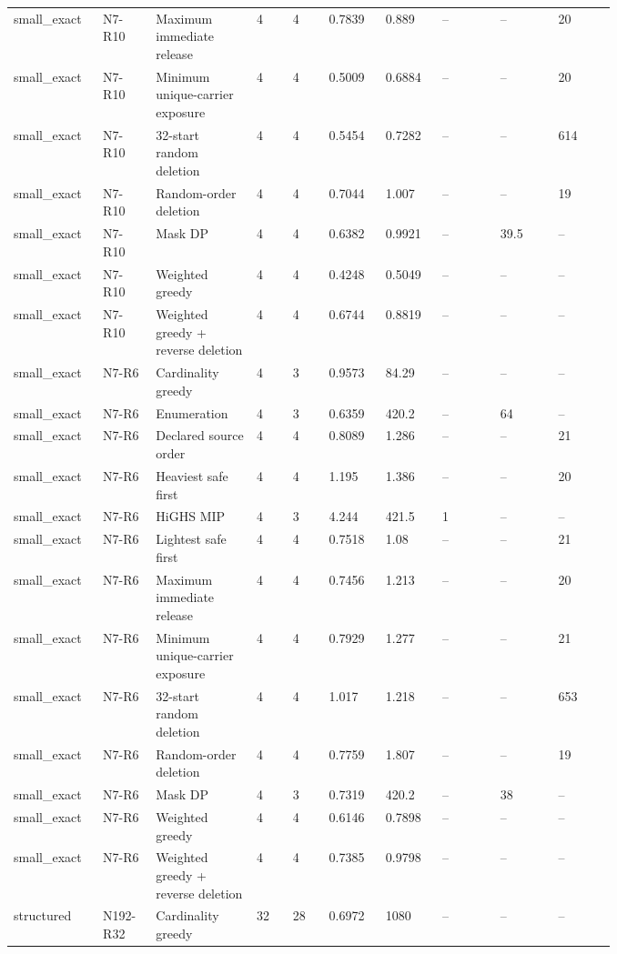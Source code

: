 {\begin{longtable}{p{0.07\linewidth}p{0.06\linewidth}p{0.13\linewidth}p{0.055\linewidth}p{0.055\linewidth}p{0.075\linewidth}p{0.075\linewidth}p{0.085\linewidth}p{0.085\linewidth}p{0.085\linewidth}}
small\_exact & N7-R10 & Maximum immediate release & 4 & 4 & 0.7839 & 0.889 & -- & -- & 20 \\
small\_exact & N7-R10 & Minimum unique-carrier exposure & 4 & 4 & 0.5009 & 0.6884 & -- & -- & 20 \\
small\_exact & N7-R10 & 32-start random deletion & 4 & 4 & 0.5454 & 0.7282 & -- & -- & 614 \\
small\_exact & N7-R10 & Random-order deletion & 4 & 4 & 0.7044 & 1.007 & -- & -- & 19 \\
small\_exact & N7-R10 & Mask DP & 4 & 4 & 0.6382 & 0.9921 & -- & 39.5 & -- \\
small\_exact & N7-R10 & Weighted greedy & 4 & 4 & 0.4248 & 0.5049 & -- & -- & -- \\
small\_exact & N7-R10 & Weighted greedy + reverse deletion & 4 & 4 & 0.6744 & 0.8819 & -- & -- & -- \\
small\_exact & N7-R6 & Cardinality greedy & 4 & 3 & 0.9573 & 84.29 & -- & -- & -- \\
small\_exact & N7-R6 & Enumeration & 4 & 3 & 0.6359 & 420.2 & -- & 64 & -- \\
small\_exact & N7-R6 & Declared source order & 4 & 4 & 0.8089 & 1.286 & -- & -- & 21 \\
small\_exact & N7-R6 & Heaviest safe first & 4 & 4 & 1.195 & 1.386 & -- & -- & 20 \\
small\_exact & N7-R6 & HiGHS MIP & 4 & 3 & 4.244 & 421.5 & 1 & -- & -- \\
small\_exact & N7-R6 & Lightest safe first & 4 & 4 & 0.7518 & 1.08 & -- & -- & 21 \\
small\_exact & N7-R6 & Maximum immediate release & 4 & 4 & 0.7456 & 1.213 & -- & -- & 20 \\
small\_exact & N7-R6 & Minimum unique-carrier exposure & 4 & 4 & 0.7929 & 1.277 & -- & -- & 21 \\
small\_exact & N7-R6 & 32-start random deletion & 4 & 4 & 1.017 & 1.218 & -- & -- & 653 \\
small\_exact & N7-R6 & Random-order deletion & 4 & 4 & 0.7759 & 1.807 & -- & -- & 19 \\
small\_exact & N7-R6 & Mask DP & 4 & 3 & 0.7319 & 420.2 & -- & 38 & -- \\
small\_exact & N7-R6 & Weighted greedy & 4 & 4 & 0.6146 & 0.7898 & -- & -- & -- \\
small\_exact & N7-R6 & Weighted greedy + reverse deletion & 4 & 4 & 0.7385 & 0.9798 & -- & -- & -- \\
structured & N192-R32 & Cardinality greedy & 32 & 28 & 0.6972 & 1080 & -- & -- & -- \\

\end{longtable}}

